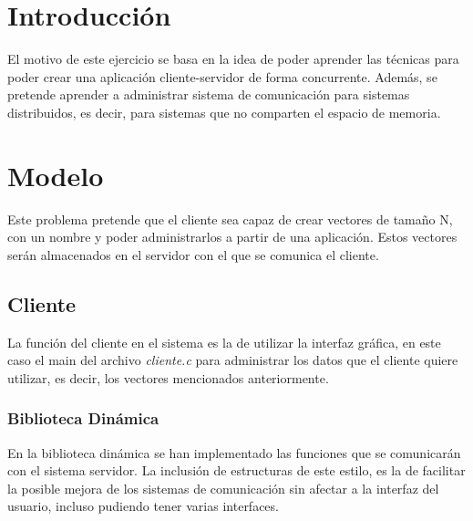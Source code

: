 \documentclass[10pt, spanish, pdftex]{template/UC3M_document}
\author{Alejandro Prieto Macías}         %
\begin{document}
\titleMain

\begin{spacing}{0.5}
    \hypersetup{linkcolor=black}    %
    \tableofcontents\newpage        %
\end{spacing}


\section{Introducción}\label{section_label}
El motivo de este ejercicio se basa en la idea de poder aprender las técnicas para poder crear una aplicación cliente-servidor de forma concurrente. Además, se pretende aprender a administrar sistema de comunicación para sistemas distribuidos, es decir, para sistemas que no comparten el espacio de memoria.



\newpage
\section{Modelo}
Este problema pretende que el cliente sea capaz de crear vectores de tamaño N, con un nombre y poder administrarlos a partir de una aplicación. Estos vectores serán almacenados en el servidor con el que se comunica el cliente.
\subsection{Cliente}
La función del cliente en el sistema es la de utilizar la interfaz gráfica, en este caso el main del archivo \textit{cliente.c} para administrar los datos que el cliente quiere utilizar, es decir, los vectores mencionados anteriormente.
\subsubsection{Biblioteca Dinámica}
En la biblioteca dinámica se han implementado las funciones que se comunicarán con el sistema servidor. La inclusión de estructuras de este estilo, es la de facilitar la posible mejora de los sistemas de comunicación sin afectar a la interfaz del usuario, incluso pudiendo tener varias interfaces.
\end{document}
